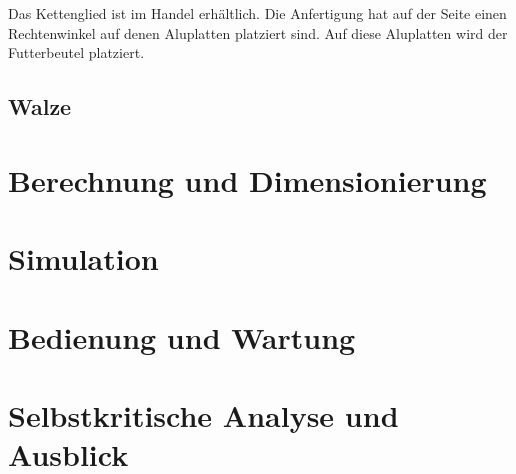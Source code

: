 Das Kettenglied ist im Handel erhältlich. Die Anfertigung hat auf der Seite einen Rechtenwinkel auf denen Aluplatten platziert sind. Auf diese Aluplatten wird der Futterbeutel platziert.


\subsection{Walze}
\section{Berechnung und Dimensionierung}
\section{Simulation}
\section{Bedienung und Wartung}
\section{Selbstkritische Analyse und Ausblick}

